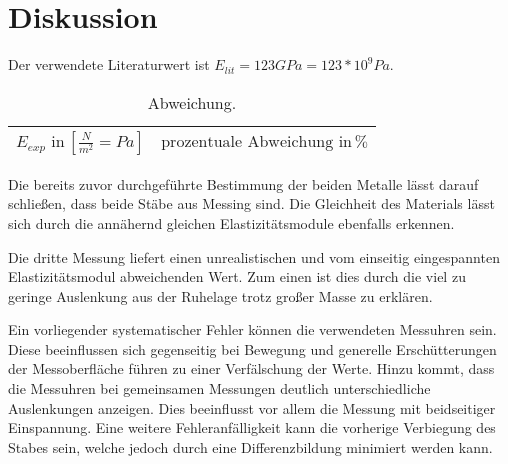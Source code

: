 \newpage
\section{Diskussion}
\label{sec:Diskussion}
Der verwendete Literaturwert ist $E_{lit} = 123 GPa = 123*10^9 Pa$\cite{litval}.
\begin{table}[h]
  \centering
  \label{tab:lit5}
  \begin{tabular}{ c c  }
    \toprule
    $E_{exp} \,\, \text{in} \, [\frac{N}{m^2}= Pa]$
   &{$\text{prozentuale Abweichung}\,\, \text{in} \, \% $} \\

    \midrule


    \bottomrule
  \end{tabular}
  \caption{Abweichung.}
\end{table}


Die bereits zuvor durchgeführte Bestimmung der beiden Metalle lässt darauf
schließen, dass beide Stäbe aus Messing sind. Die Gleichheit des Materials
lässt sich durch die annähernd gleichen Elastizitätsmodule ebenfalls
erkennen.

Die dritte Messung liefert einen unrealistischen und vom einseitig
eingespannten Elastizitätsmodul abweichenden Wert. Zum einen ist dies durch die viel zu geringe Auslenkung
aus der Ruhelage trotz großer Masse zu erklären.

Ein vorliegender systematischer Fehler können die verwendeten Messuhren sein.
Diese beeinflussen sich gegenseitig bei Bewegung und generelle Erschütterungen
der Messoberfläche führen zu einer Verfälschung der Werte. Hinzu kommt, dass
die Messuhren bei gemeinsamen Messungen deutlich unterschiedliche Auslenkungen
anzeigen. Dies beeinflusst vor allem die Messung mit beidseitiger
Einspannung.
Eine weitere Fehleranfälligkeit kann die vorherige Verbiegung des Stabes
sein, welche jedoch durch eine Differenzbildung minimiert werden kann.
